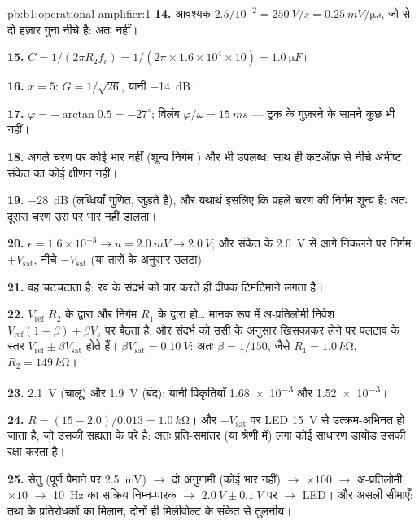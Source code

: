 \begin{solution}{pb:b1:operational-amplifier:1}
\textbf{14.} आवश्यक $2.5/10^{-2} = \qty{250}{V/s} = \qty{0.25}{mV/\micro s}$,
जो  से दो हज़ार गुना नीचे है: अतः नहीं।

\textbf{15.} $C = 1/(2\pi R_2f_c) = 1/(2\pi \times 1.6\times10^4 \times 10)
= \qty{1.0}{\micro F}$।

\textbf{16.} $x = 5$: $G = 1/\sqrt{26}$, यानी \qty{-14}{dB}।

\textbf{17.} $\varphi = -\arctan 0.5 = -27^\circ$; विलंब $\varphi/\omega =
\qty{15}{ms}$ --- ट्रक के गुज़रने के सामने कुछ भी नहीं।

\textbf{18.} अगले चरण पर कोई भार नहीं (शून्य निर्गम )
और  भी उपलब्ध; साथ ही कटऑफ़ से नीचे अभीष्ट संकेत का कोई क्षीणन नहीं।

\textbf{19.} \qty{-28}{dB} (लब्धियाँ गुणित,  जुड़ते हैं), और यथार्थ
इसलिए कि पहले चरण की निर्गम  शून्य है: अतः दूसरा चरण उस पर भार नहीं
डालता।

\textbf{20.} $\epsilon = 1.6\times10^{-3} \to u = \qty{2.0}{mV} \to
\qty{2.0}{V}$; और संकेत के \qty{2.0}{V} से आगे निकलने पर निर्गम
$+V_{\mathrm{sat}}$, नीचे $-V_{\mathrm{sat}}$ (या तारों के अनुसार उलटा)।

\textbf{21.} वह चटचटाता है: रव के संदर्भ को पार करते ही दीपक टिमटिमाने
लगता है।

\textbf{22.} $V_{\mathrm{ref}}$ $R_2$ के द्वारा और निर्गम
$R_1$ के द्वारा हो\dots{} मानक रूप में अ-प्रतिलोमी निवेश
$V_{\mathrm{ref}}(1 - \beta) + \beta V_s$ पर बैठता है; और संदर्भ को उसी के
अनुसार खिसकाकर लेने पर पलटाव के स्तर $V_{\mathrm{ref}} \pm \beta V_{\mathrm{sat}}$ होते हैं।
$\beta V_{\mathrm{sat}} = \qty{0.10}{V}$: अतः $\beta = 1/150$, जैसे $R_1 =
\qty{1.0}{k\ohm}$, $R_2 = \qty{149}{k\ohm}$।

\textbf{23.} \qty{2.1}{V} (चालू) और \qty{1.9}{V} (बंद): यानी विकृतियाँ
\num{1.68e-3} और \num{1.52e-3}।

\textbf{24.} $R = (15 - 2.0)/0.013 = \qty{1.0}{k\ohm}$। और
$-V_{\mathrm{sat}}$ पर LED \qty{15}{V} से उत्क्रम-अभिनत हो जाता है, जो उसकी
सह्यता के परे है: अतः प्रति-समांतर (या श्रेणी में) लगा कोई साधारण डायोड उसकी रक्षा करता है।

\textbf{25.} सेतु (पूर्ण पैमाने पर \qty{2.5}{mV}) $\to$ दो अनुगामी (कोई
भार नहीं) $\to$  $\times100$ $\to$ अ-प्रतिलोमी
$\times10$ $\to$ \qty{10}{Hz} का सक्रिय निम्न-पारक $\to$ 
$\qty{2.0}{V} \pm \qty{0.1}{V}$ पर $\to$ LED। और असली सीमाएँ:  तथा  के प्रतिरोधकों का मिलान, दोनों ही
मिलीवोल्ट के संकेत से तुलनीय।
\end{solution}
